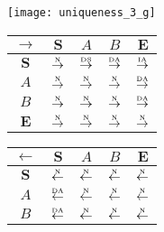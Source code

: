\begin{figure}[htbp]
  \begin{subfigure}{1\textwidth}
    \vspace{1em}
    \centering
    \begin{minipage}[b]{1\textwidth}
      \centering
      \texttt{[image: uniqueness\_3\_g]}
    \end{minipage}
    \begin{minipage}[b]{0.3\textwidth}
      \vspace{1em}
      \centering
      \begin{tabular}{|c|c|c|c|c|} \hline
        $\rightarrow$ & $\bm{S}$ & $A$ & $B$ & $\bm{E}$\\ \hline
        $\bm{S}$ & $\overset{\text{\tiny{N}}}{\rightarrow}$ & $\overset{\text{\tiny{DS}}}{\rightarrow}$ & $\overset{\text{\tiny{DA}}}{\rightarrow}$ & $\overset{\text{\tiny{IA}}}{\rightarrow}$\\ \hline
        $A$ & $\overset{\text{\tiny{N}}}{\rightarrow}$ & $\overset{\text{\tiny{N}}}{\rightarrow}$ & $\overset{\text{\tiny{N}}}{\rightarrow}$ & $\overset{\text{\tiny{DA}}}{\rightarrow}$\\ \hline
        $B$ & $\overset{\text{\tiny{N}}}{\rightarrow}$ & $\overset{\text{\tiny{N}}}{\rightarrow}$ & $\overset{\text{\tiny{N}}}{\rightarrow}$ & $\overset{\text{\tiny{DA}}}{\rightarrow}$\\ \hline
        $\bm{E}$ & $\overset{\text{\tiny{N}}}{\rightarrow}$ & $\overset{\text{\tiny{N}}}{\rightarrow}$ & $\overset{\text{\tiny{N}}}{\rightarrow}$ & $\overset{\text{\tiny{N}}}{\rightarrow}$\\ \hline
      \end{tabular}
    \end{minipage}
    \begin{minipage}[b]{0.3\textwidth}
      \vspace{1em}
      \centering
      \begin{tabular}{|c|c|c|c|c|} \hline
        $\leftarrow$ & $\bm{S}$ & $A$ & $B$ & $\bm{E}$\\ \hline
        $\bm{S}$ & $\overset{\text{\tiny{N}}}{\leftarrow}$ & $\overset{\text{\tiny{N}}}{\leftarrow}$ & $\overset{\text{\tiny{N}}}{\leftarrow}$ & $\overset{\text{\tiny{N}}}{\leftarrow}$\\ \hline
        $A$ & $\overset{\text{\tiny{DA}}}{\leftarrow}$ & $\overset{\text{\tiny{N}}}{\leftarrow}$ & $\overset{\text{\tiny{N}}}{\leftarrow}$ & $\overset{\text{\tiny{N}}}{\leftarrow}$\\ \hline
        $B$ & $\overset{\text{\tiny{DA}}}{\leftarrow}$ & $\overset{\text{\tiny{N}}}{\leftarrow}$ & $\overset{\text{\tiny{N}}}{\leftarrow}$ & $\overset{\text{\tiny{N}}}{\leftarrow}$\\ \hline

\end{tabular}
\end{minipage}
\end{subfigure}
\end{figure}
